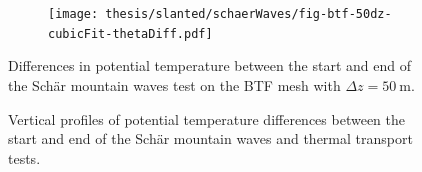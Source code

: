 \begin{figure}
	\centering
	\begin{subfigure}{\textwidth}
		\centering
		\texttt{[image: thesis/slanted/schaerWaves/fig-btf-50dz-cubicFit-thetaDiff.pdf]}
	\end{subfigure}
	\caption{Differences in potential temperature between the start and end of the Sch\"{a}r mountain waves test on the BTF mesh with $\Delta z = \SI{50}{\meter}$.  }
	\label{fig:slanted:schaerWaves:thetaDiff}
\end{figure}

\begin{figure}
	
	\caption{Vertical profiles of potential temperature differences between the start and end of the Sch\"{a}r mountain waves and thermal transport tests.  \TODO{}}
	\label{fig:slanted:sampleLines}
\end{figure}
